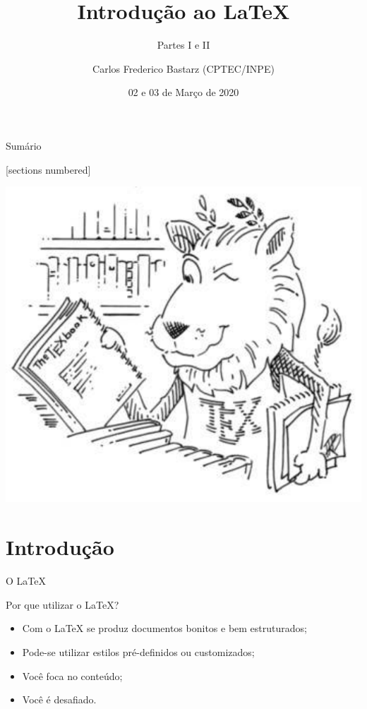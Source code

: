 \documentclass[10pt]{beamer}
\title{Introdução ao \LaTeX}
\subtitle{Partes I e II}
\date{02 e 03 de Março de 2020}
\author{Carlos Frederico Bastarz (CPTEC/INPE)}
\institute{Instituto Nacional de Pesquisas Espaciais (INPE)}
\begin{document}
\maketitle

\begin{frame}[c]{Sumário}
    \vspace{2em}
    \begin{multicols}{2}
        \begin{minipage}{0.49\textwidth}
           \vspace{12mm}
           [sections numbered]
           \tableofcontents[hideallsubsections]
        \end{minipage}
        \begin{minipage}{0.49\textwidth}
            \includegraphics[width=\textwidth]{./figs/ctan_lion_350x350.pdf}
        \end{minipage}
    \end{multicols}
\end{frame}

\section{Introdução}

\begin{frame}{O \LaTeX{}}
	\begin{block}{Por que utilizar o \LaTeX{}?}
		\begin{itemize}
			\pause
			\item Com o \LaTeX{} se produz documentos bonitos e bem estruturados;
			\pause
			\item Pode-se utilizar estilos pré-definidos ou customizados;
			\pause
			\item Você foca no conteúdo;
			\pause
			\item Você é desafiado.
		\end{itemize}
	\end{block}
\end{frame}
\end{document}
